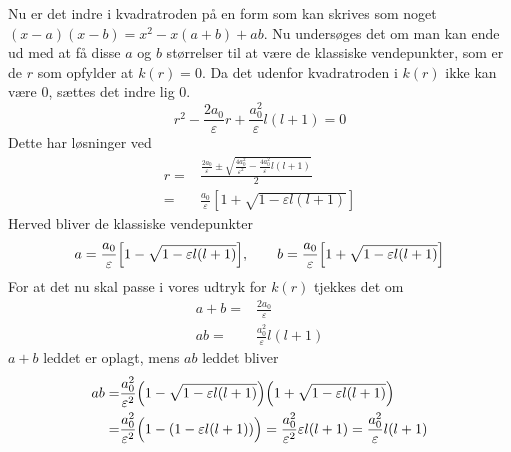 Nu er det indre i kvadratroden på en form som kan skrives som noget $(x-a)(x-b) = x^2 -x(a+b) + ab$. Nu undersøges det om man kan ende ud med at få disse $a$ og $b$ størrelser til at være de klassiske vendepunkter, som er de $r$ som opfylder at $k(r) = 0$.
Da det udenfor kvadratroden i $k(r)$ ikke kan være 0, sættes det indre lig 0.
\begin{equation}
  r^2 - \frac{2a_0}{\varepsilon}r + \frac{a_0^2}{\varepsilon}l(l+1) = 0
\end{equation}
Dette har løsninger ved
\begin{align}
  r = & \frac{\frac{2a_0}{\varepsilon} \pm \sqrt{\frac{4a_0^2}{\varepsilon^2} - \frac{4a_0^2}{\varepsilon}l(l+1)   }  }{2}\\
    = & \frac{a_0}{\varepsilon}[1+\sqrt{1-\varepsilon l(l+1)}]
\end{align}
Herved bliver de klassiske vendepunkter
\begin{align}
  a =  \frac{a_0}{\varepsilon}\Bigl[1-\sqrt{1-\varepsilon l(l+1)}  \Bigr],\qquad b =  \frac{a_0}{\varepsilon}\Bigl[1+\sqrt{1-\varepsilon l(l+1)}  \Bigr]
\end{align}
For at det nu skal passe i vores udtryk for $k(r)$ tjekkes det om
\begin{align}
  a+b = & \frac{2a_0}{\varepsilon} \\
  ab  = & \frac{a_0^2}{\varepsilon} l(l+1)
\end{align}
$a+b$ leddet er oplagt, mens $ab$ leddet bliver
\begin{align}
  ab = & \frac{a_0^2}{\varepsilon^2}\Bigl(1-\sqrt{1-\varepsilon l(l+1)} \Bigr)\Bigl(1+\sqrt{1-\varepsilon l(l+1)} \Bigr)\\
     = & \frac{a_0^2}{\varepsilon^2}\Bigl(1-(1-\varepsilon l(l+1)) \Bigr) =  \frac{a_0^2}{\varepsilon^2} \varepsilon l(l+1)
     = \frac{a_0^2}{\varepsilon} l(l+1)
\end{align}

